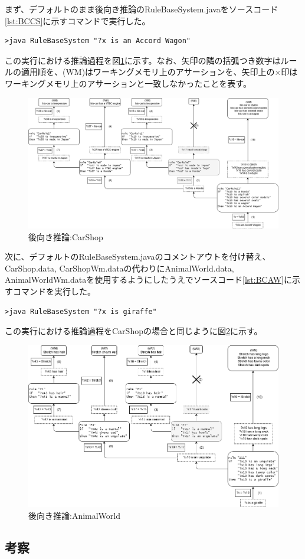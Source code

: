 \documentclass{jsarticle} %
\begin{document}
まず、デフォルトのまま後向き推論のRuleBaseSystem.javaをソースコード\ref{lst:BCCS}に示すコマンドで実行した。

\begin{lstlisting}[caption=後ろ向き推論1,label=lst:BCCS]
>java RuleBaseSystem "?x is an Accord Wagon"
\end{lstlisting}

この実行における推論過程を図\ref{fig:BCCS}に示す。なお、矢印の隣の括弧つき数字はルールの適用順を、(WM)はワーキングメモリ上のアサーションを、矢印上の×印はワーキングメモリ上のアサーションと一致しなかったことを表す。

\begin{figure}[htbp]
\includegraphics[bb=0 0 401 532,width=0.34\linewidth]{Backward1.png}
\caption{後向き推論:CarShop}
\label{fig:BCCS}
\end{figure}

\pagebreak
次に、デフォルトのRuleBaseSystem.javaのコメントアウトを付け替え、CarShop.data, CarShopWm.dataの代わりにAnimalWorld.data, AnimalWorldWm.dataを使用するようにしたうえでソースコード\ref{lst:BCAW}に示すコマンドを実行した。

\begin{lstlisting}[caption=後向き推論2,label=lst:BCAW]
>java RuleBaseSystem "?x is giraffe"
\end{lstlisting}

この実行における推論過程をCarShopの場合と同じように図\ref{fig:BCAW}に示す。

\begin{figure}[htbp]
\includegraphics[bb=0 0 401 532,width=0.41\linewidth]{Backward2.png}
\caption{後向き推論:AnimalWorld}
\label{fig:BCAW}
\end{figure}

\pagebreak
\subsection{考察}
\end{document}
